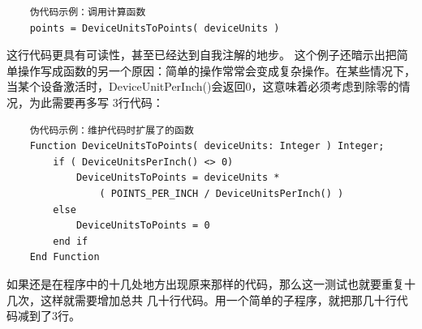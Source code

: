 \documentclass{article}
\begin{document}
\begin{lstlisting}
    伪代码示例：调用计算函数
    points = DeviceUnitsToPoints( deviceUnits )
\end{lstlisting}
这行代码更具有可读性，甚至已经达到自我注解的地步。
这个例子还暗示出把简单操作写成函数的另一个原因：简单的操作常常会变成复杂操作。在某些情况下，
当某个设备激活时，DeviceUnitPerInch()会返回0，这意味着必须考虑到除零的情况，为此需要再多写
3行代码：
\begin{lstlisting}
    伪代码示例：维护代码时扩展了的函数
    Function DeviceUnitsToPoints( deviceUnits: Integer ) Integer;
        if ( DeviceUnitsPerInch() <> 0)
            DeviceUnitsToPoints = deviceUnits * 
                ( POINTS_PER_INCH / DeviceUnitsPerInch() )
        else
            DeviceUnitsToPoints = 0
        end if
    End Function
\end{lstlisting}
如果还是在程序中的十几处地方出现原来那样的代码，那么这一测试也就要重复十几次，这样就需要增加总共
几十行代码。用一个简单的子程序，就把那几十行代码减到了3行。
\end{document}
